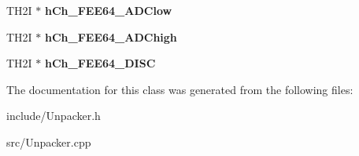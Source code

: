 \begin{DoxyCompactItemize}
\item 
\hypertarget{classUnpacker_af67d4704ade07c9cf4ad17d6e90ce741}{T\-H2\-I $\ast$ {\bfseries h\-Ch\-\_\-\-F\-E\-E64\-\_\-\-A\-D\-Clow}}\label{classUnpacker_af67d4704ade07c9cf4ad17d6e90ce741}

\item 
\hypertarget{classUnpacker_ada79a2742e6a21f5c9cee46074ac2a5b}{T\-H2\-I $\ast$ {\bfseries h\-Ch\-\_\-\-F\-E\-E64\-\_\-\-A\-D\-Chigh}}\label{classUnpacker_ada79a2742e6a21f5c9cee46074ac2a5b}

\item 
\hypertarget{classUnpacker_a2a01879ac931f3dbf2ce4bbc5297eff4}{T\-H2\-I $\ast$ {\bfseries h\-Ch\-\_\-\-F\-E\-E64\-\_\-\-D\-I\-S\-C}}\label{classUnpacker_a2a01879ac931f3dbf2ce4bbc5297eff4}

\end{DoxyCompactItemize}


The documentation for this class was generated from the following files\-:\begin{DoxyCompactItemize}
\item 
include/Unpacker.\-h\item 
src/Unpacker.\-cpp\end{DoxyCompactItemize}
